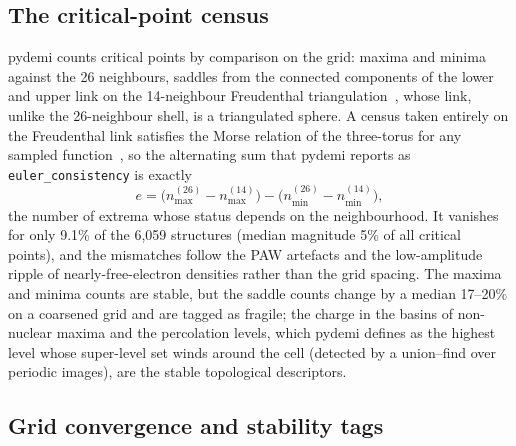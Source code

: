 \documentclass[11pt,a4paper]{article}
\begin{document}
\subsection{The critical-point census}
\label{sec:numerics:census}

pydemi counts critical points by comparison on the grid: maxima and minima
against the 26 neighbours, saddles from the connected components of the lower
and upper link on the 14-neighbour Freudenthal triangulation~\cite{freudenthal1942},
whose link, unlike the 26-neighbour shell, is a triangulated sphere. A census
taken entirely on the Freudenthal link satisfies the Morse relation of the
three-torus for any sampled function~\cite{banchoff1970}, so the alternating
sum that pydemi reports as \texttt{euler\_consistency} is exactly
\begin{equation}
e = \big(n_{\max}^{(26)}-n_{\max}^{(14)}\big) - \big(n_{\min}^{(26)}-n_{\min}^{(14)}\big),
\end{equation}
the number of extrema whose status depends on the neighbourhood. It vanishes
for only 9.1\% of the 6,059 structures (median magnitude 5\% of all critical
points), and the mismatches follow the PAW artefacts and the low-amplitude
ripple of nearly-free-electron densities rather than the grid spacing. The
maxima and minima counts are stable, but the saddle counts change by a median
17--20\% on a coarsened grid and are tagged as fragile; the charge in the
basins of non-nuclear maxima and the percolation levels, which pydemi defines
as the highest level whose super-level set winds around the cell (detected by a
union--find over periodic images), are the stable topological descriptors.

\subsection{Grid convergence and stability tags}
\label{sec:numerics:convergence}
\end{document}
